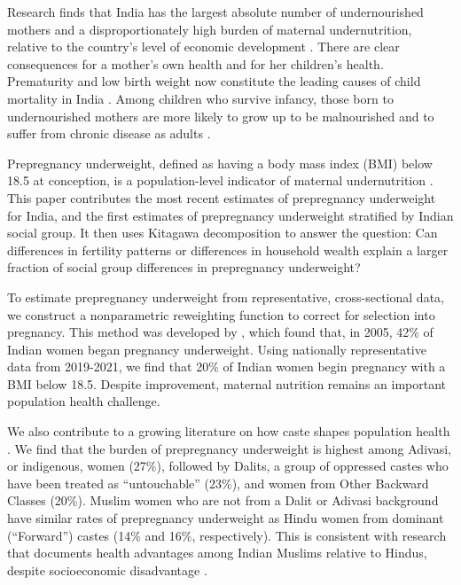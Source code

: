 \documentclass[12pt]{article}
\begin{document}
Research finds that India has the largest absolute number of undernourished mothers and a disproportionately high burden of maternal undernutrition, relative to the country’s level of economic development \citep{bhutta2000has, coffey2015prepregnancy}. There are clear consequences for a mother's own health and for her children's health.  Prematurity and low birth weight now constitute the leading causes of child mortality in India \citep{fadel2017changes}. Among children who survive infancy, those born to undernourished mothers are more likely to grow up to be malnourished and to suffer from chronic disease as adults \citep{underwood2002health, almond2011killing}.

Prepregnancy underweight, defined as having a body mass index (BMI) below 18.5 at conception, is a population-level indicator of maternal undernutrition \citep{who_nlis_malnutrition_women_2021}. This paper contributes the most recent estimates of prepregnancy underweight for India, and the first estimates of prepregnancy underweight stratified by Indian social group.  It then uses Kitagawa decomposition to answer the question: Can differences in fertility patterns or differences in household wealth explain a larger fraction of social group differences in prepregnancy underweight?

To estimate prepregnancy underweight from representative, cross-sectional data, we construct a nonparametric reweighting function to correct for selection into pregnancy.  This method was developed by \cite{coffey2015prepregnancy}, which found that, in 2005, 42\% of Indian women began pregnancy underweight.  Using nationally representative data from 2019-2021, we find that 20\% of Indian women begin pregnancy with a BMI below 18.5. Despite improvement, maternal nutrition remains an important population health challenge.  

We also contribute to a growing literature on how caste shapes population health  \citep{vyas2022social, coffey2019local, lopalo2019consequences, bora2019persistent}. We find that the burden of prepregnancy underweight is highest among Adivasi, or indigenous, women (27\%), followed by Dalits, a group of oppressed castes who have been treated as ``untouchable'' (23\%), and women from Other Backward Classes (20\%).  Muslim women who are not from a Dalit or Adivasi background have similar rates of prepregnancy underweight as Hindu women from dominant (``Forward'') castes (14\% and 16\%, respectively).  This is consistent with research that documents health advantages among Indian Muslims relative to Hindus, despite socioeconomic disadvantage \citep{guillot2010hindu, bhalotra2010puzzle, visaria2015preference, geruso2018neighborhood, sharma_gupta_2025}.  
\end{document}
